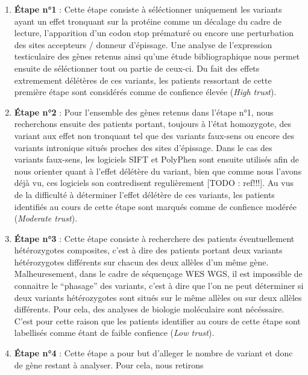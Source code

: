 \documentclass[12pt,twoside]{reedthesis}
\providecommand{\tightlist}{%
  \setlength{\itemsep}{0pt}\setlength{\parskip}{0pt}}
\theoremstyle{definition}
\theoremstyle{definition}
\theoremstyle{remark}
\begin{document}
  \begin{enumerate}
  \def\labelenumi{\arabic{enumi}.}
  \tightlist
  \item
    \textbf{Étape n°1} : Cette étape consiste à séléctionner uniquement
    les variants ayant un effet tronquant sur la protéine comme un
    décalage du cadre de lecture, l'apparition d'un codon stop prématuré
    ou encore une perturbation des sites accepteurs / donneur d'épissage.
    Une analyse de l'expression testiculaire des gènes retenus ainsi
    qu'une étude bibliographique nous permet ensuite de séléctionner tout
    ou partie de ceux-ci. Du fait des effets extremement délétères de ces
    variants, les patients ressortant de cette première étape sont
    considérés comme de confience élevée (\emph{High trust}).\\
  \item
    \textbf{Étape n°2} : Pour l'ensemble des gènes retenus dans l'étape
    n°1, nous recherchons ensuite des patients portant, toujours à l'état
    homozygote, des variant aux effet non tronquant tel que des variants
    faux-sens ou encore des variants intronique situés proches des sites
    d'épissage. Dans le cas des variants faux-sens, les logiciels SIFT et
    PolyPhen sont ensuite utilisés afin de nous orienter quant à l'effet
    délétère du variant, bien que comme nous l'avons déjà vu, ces
    logiciels son contredisent regulièrement {[}TODO : ref!!!{]}. Au vus
    de la difficulté à déterminer l'effet délétère de ces variants, les
    patients identifiés au cours de cette étape sont marqués comme de
    confience modérée (\emph{Moderate trust}).\\
  \item
    \textbf{Étape n°3} : Cette étape consiste à recherchere des patients
    éventuellement hétérozygotes composites, c'est à dire des patients
    portant deux variants hétérozygotes différents sur chacun des deux
    allèles d'un même gène. Malheuresement, dans le cadre de séquençage
    WES WGS, il est impossible de connaitre le ``phasage'' des variants,
    c'est à dire que l'on ne peut déterminer si deux variants
    hétérozygotes sont situés sur le même allèles ou sur deux allèles
    différents. Pour cela, des analyses de biologie moléculaire sont
    nécéssaire. C'est pour cette raison que les patients identifier au
    cours de cette étape sont labellisés comme étant de faible confience
    (\emph{Low trust}).
  \item
    \textbf{Étape n°4} : Cette étape a pour but d'alleger le nombre de
    variant et donc de gène restant à analyser. Pour cela, nous retirons

\end{enumerate}
\end{document}
